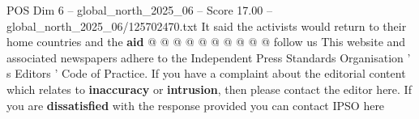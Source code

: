 \begin{textsample}{POS Dim 6 – global\_north\_2025\_06 – Score 17.00 – global\_north\_2025\_06/125702470.txt}
It said the activists would return to their home countries and the \textbf{aid} @ @ @ @ @ @ @ @ @ @ follow us This website and associated newspapers adhere to the Independent Press Standards Organisation ' s Editors ' Code of Practice.
If you have a complaint about the editorial content which relates to \textbf{inaccuracy} or \textbf{intrusion}, then please contact the editor here.
If you are \textbf{dissatisfied} with the response provided you can contact IPSO here

\end{textsample}
